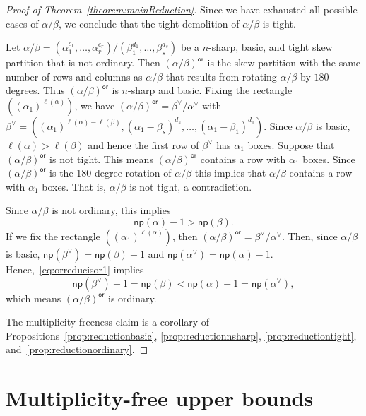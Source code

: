 \documentclass[10pt]{article}
\theoremstyle{definition}
\newcommand{\np}{\mathsf{np}}
\newcommand{\orsf}{\mathsf{or}}
\begin{document}
\begin{proof}[Proof of Theorem~\ref{theorem:mainReduction}]
Since we have exhausted all possible cases of $\alpha/\beta$, we conclude that the tight demolition of $\alpha/\beta$ is tight.

Let $\alpha / \beta = (\alpha_1^{c_1},\ldots,\alpha_r^{c_r}) / (\beta_1^{d_1},\ldots,\beta_s^{d_s})$ be a $n$-sharp, basic, and tight skew partition that is not ordinary. Then $(\alpha / \beta)^{\orsf}$ is the skew partition with the same number of rows and columns as $\alpha / \beta$ that results from rotating $\alpha / \beta$ by $180$ degrees. Thus $(\alpha / \beta)^{\orsf}$ is $n$-sharp and basic. Fixing the rectangle $((\alpha_1)^{\ell(\alpha)})$, we have $(\alpha / \beta)^{\orsf} = \beta^{\vee} / \alpha^{\vee}$ with $\beta^{\vee} = ((\alpha_1)^{\ell(\alpha) - \ell(\beta)},(\alpha_1-\beta_s)^{d_s},\ldots, (\alpha_1-\beta_1)^{d_1})$. Since $\alpha / \beta$ is basic, $\ell(\alpha) > \ell(\beta)$ and hence the first row of $\beta^{\vee}$ has $\alpha_1$ boxes. Suppose that $(\alpha / \beta)^{\orsf}$ is not tight. This means $(\alpha / \beta)^{\orsf}$ contains a row with $\alpha_1$ boxes. Since $(\alpha / \beta)^{\orsf}$ is the 180 degree rotation of $\alpha / \beta$ this implies that $\alpha / \beta$ contains a row with $\alpha_1$ boxes. That is, $\alpha / \beta$ is not tight, a contradiction.

Since $\alpha / \beta$ is not ordinary, this implies 
\begin{equation}
\label{eq:orreducisor1}
\np (\alpha) - 1 > \np (\beta).
\end{equation}
If we fix the rectangle $((\alpha_1)^{\ell(\alpha)})$, then $(\alpha / \beta)^{\orsf} = \beta^{\vee} / \alpha^{\vee}$. Then, since $\alpha / \beta$ is basic, $\np (\beta^{\vee}) = \np (\beta) + 1$ and $\np (\alpha^{\vee}) = \np (\alpha) - 1$. Hence,~\eqref{eq:orreducisor1} implies
\begin{equation}
\np (\beta^{\vee}) - 1 = \np (\beta) < \np (\alpha) - 1 = \np (\alpha^{\vee}),
\end{equation}
which means $(\alpha / \beta)^{\orsf}$ is ordinary.

The multiplicity-freeness claim is a corollary of Propositions~\ref{prop:reductionbasic}, \ref{prop:reductionnsharp}, \ref{prop:reductiontight}, and~\ref{prop:reductionordinary}.
\end{proof}


\section{Multiplicity-free upper bounds}
\end{document}
